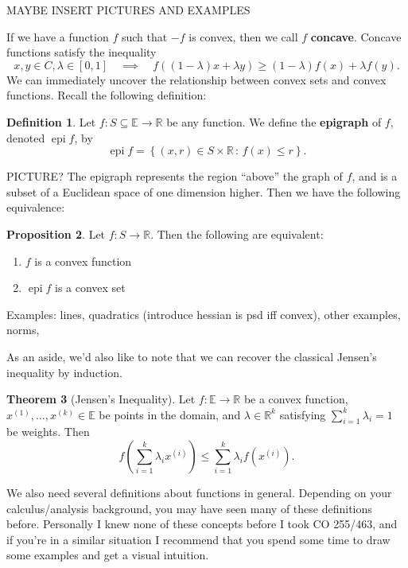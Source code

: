 \documentclass[11pt]{article}
\numberwithin{equation}{section}
\theoremstyle{definition}
\newtheorem{theorem}{Theorem}[section]
\newtheorem{proposition}[theorem]{Proposition}
\newtheorem{definition}[theorem]{Definition}%
\newcommand{\bE}{\mathbb{E}}
\newcommand{\bR}{\mathbb{R}}
\newcommand{\set}[2]{\left\{#1\,:\,#2\right\}}
\newcommand{\epi}{\operatorname{epi}}
\begin{document}
MAYBE INSERT PICTURES AND EXAMPLES

If we have a function $f$ such that $-f$ is convex, then we call $f$ \textbf{concave}. Concave functions satisfy the inequality
    \begin{equation}
        \label{defccvfneq}
        x, y\in C, \lambda\in[0, 1]\quad\implies\quad f((1-\lambda)x+\lambda y)\ge (1-\lambda)f(x)+\lambda f(y).
    \end{equation}
We can immediately uncover the relationship between convex sets and convex functions. Recall the following definition:
\begin{definition}
    Let $f:S\subseteq\bE\to\bR$ be any function. We define the \textbf{epigraph} of $f$, denoted $\epi f$, by
    \begin{equation}
        \epi f=\set{(x, r)\in S\times\bR}{f(x)\le r}.
    \end{equation}
\end{definition}
PICTURE? The epigraph represents the region ``above'' the graph of $f$, and is a subset of a Euclidean space of one dimension higher. Then we have the following equivalence:
\begin{proposition}
    Let $f:S\to\bR$. Then the following are equivalent:
    \begin{enumerate}[label=(\roman*)]
        \item $f$ is a convex function
        \item $\epi f$ is a convex set
    \end{enumerate}
\end{proposition}
Examples: lines, quadratics (introduce hessian is psd iff convex), other examples, norms,

As an aside, we'd also like to note that we can recover the classical Jensen's inequality by induction.
\begin{theorem}[Jensen's Inequality]
    Let $f:\bE\to\bR$ be a convex function, $x^{(1)},\dots, x^{(k)}\in\bE$ be points in the domain, and $\lambda\in\bR^k$ satisfying $\sum_{i=1}^k\lambda_i=1$ be weights. Then
    \begin{equation}
        f\left(\sum_{i=1}^k\lambda_ix^{(i)}\right)\le\sum_{i=1}^k\lambda_if(x^{(i)}).
    \end{equation}
\end{theorem}
We also need several definitions about functions in general. Depending on your calculus/analysis background, you may have seen many of these definitions before. Personally I knew none of these concepts before I took CO 255/463, and if you're in a similar situation I recommend that you spend some time to draw some examples and get a visual intuition.
\end{document}
